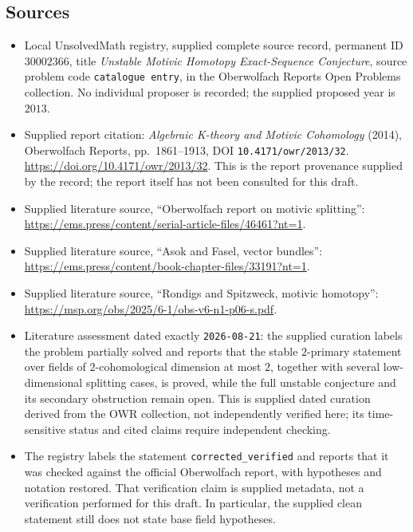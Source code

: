 \documentclass[11pt]{article}
\begin{document}
\subsection{Sources}
\begin{itemize}
\item Local UnsolvedMath registry, supplied complete source record, permanent ID \(30002366\), title \emph{Unstable Motivic Homotopy Exact-Sequence Conjecture}, source problem code \texttt{catalogue entry}, in the Oberwolfach Reports Open Problems collection. No individual proposer is recorded; the supplied proposed year is \(2013\).
\item Supplied report citation: \emph{Algebraic K-theory and Motivic Cohomology} (2014), Oberwolfach Reports, pp.\ 1861--1913, DOI \texttt{10.4171/owr/2013/32}. \url{https://doi.org/10.4171/owr/2013/32}. This is the report provenance supplied by the record; the report itself has not been consulted for this draft.
\item Supplied literature source, ``Oberwolfach report on motivic splitting'': \url{https://ems.press/content/serial-article-files/46461?nt=1}.
\item Supplied literature source, ``Asok and Fasel, vector bundles'': \url{https://ems.press/content/book-chapter-files/33191?nt=1}.
\item Supplied literature source, ``Rondigs and Spitzweck, motivic homotopy'': \url{https://msp.org/obs/2025/6-1/obs-v6-n1-p06-s.pdf}.
\item Literature assessment dated exactly \texttt{2026-08-21}: the supplied curation labels the problem partially solved and reports that the stable \(2\)-primary statement over fields of \(2\)-cohomological dimension at most \(2\), together with several low-dimensional splitting cases, is proved, while the full unstable conjecture and its secondary obstruction remain open. This is supplied dated curation derived from the OWR collection, not independently verified here; its time-sensitive status and cited claims require independent checking.
\item The registry labels the statement \texttt{corrected\_verified} and reports that it was checked against the official Oberwolfach report, with hypotheses and notation restored. That verification claim is supplied metadata, not a verification performed for this draft. In particular, the supplied clean statement still does not state base field hypotheses.
\end{itemize}
\end{document}
